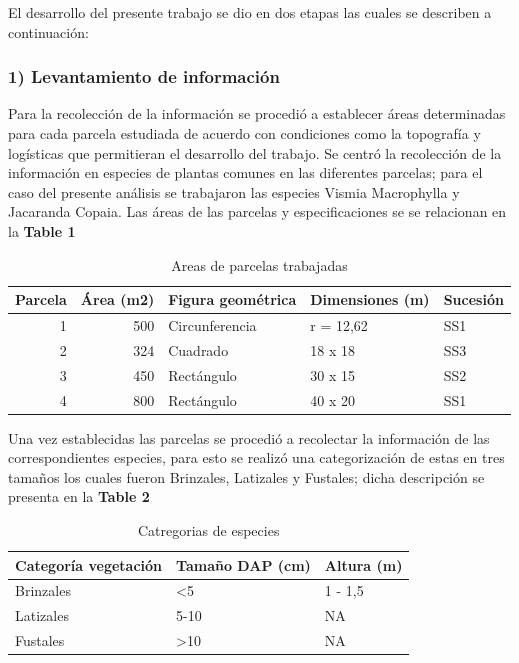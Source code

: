 \documentclass[letterpaper,9pt,onecolumn,twoside,]{pinp}
\begin{document}
El desarrollo del presente trabajo se dio en dos etapas las cuales se
describen a continuación:

\hypertarget{levantamiento-de-informaciuxf3n}{%
\subsubsection{1) Levantamiento de
información}\label{levantamiento-de-informaciuxf3n}}

Para la recolección de la información se procedió a establecer áreas
determinadas para cada parcela estudiada de acuerdo con condiciones como
la topografía y logísticas que permitieran el desarrollo del trabajo. Se
centró la recolección de la información en especies de plantas comunes
en las diferentes parcelas; para el caso del presente análisis se
trabajaron las especies Vismia Macrophylla y Jacaranda Copaia. Las áreas
de las parcelas y especificaciones se se relacionan en la \textbf{Table
1}

\begin{table}

\caption{\label{tab:unnamed-chunk-1}Areas de parcelas trabajadas}
\centering
\begin{tabular}[t]{r|r|l|l|l}
\hline
Parcela & Área (m2) & Figura geométrica & Dimensiones (m) & Sucesión\\
\hline
1 & 500 & Circunferencia & r = 12,62 & SS1\\
\hline
2 & 324 & Cuadrado & 18 x 18 & SS3\\
\hline
3 & 450 & Rectángulo & 30 x 15 & SS2\\
\hline
4 & 800 & Rectángulo & 40 x 20 & SS1\\
\hline
\end{tabular}
\end{table}

Una vez establecidas las parcelas se procedió a recolectar la
información de las correspondientes especies, para esto se realizó una
categorización de estas en tres tamaños
los cuales fueron Brinzales, Latizales y Fustales; dicha descripción se
presenta en la \textbf{Table 2}

\begin{table}

\caption{\label{tab:unnamed-chunk-2}Catregorias de especies}
\centering
\begin{tabular}[t]{l|l|l}
\hline
Categoría vegetación & Tamaño DAP (cm) & Altura (m)\\
\hline
Brinzales & <5 & 1 - 1,5\\
\hline
Latizales & 5-10 & NA\\
\hline
Fustales & >10 & NA\\
\hline
\end{tabular}
\end{table}
\end{document}

